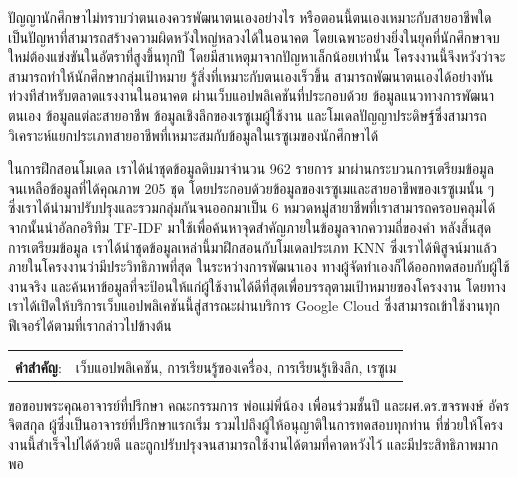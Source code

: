 \documentclass[12pt,oneside,openright,a4paper]{cpe-thai-project}
\begin{document}
\thaiabstract

ปัญญานักศึกษาไม่ทราบว่าตนเองควรพัฒนาตนเองอย่างไร หรือตอนนี้ตนเองเหมาะกับสายอาชีพใด เป็นปัญหาที่สามารถสร้างความผิดหวังใหญ่หลวงได้ในอนาคต
โดยเฉพาะอย่างยิ่งในยุคที่นักศึกษาจบใหม่ต้องแข่งขันในอัตราที่สูงขึ้นทุกปี โดยมีสาเหตุมาจากปัญหาเล็กน้อยเท่านั้น โครงงานนี้จึงหวังว่าจะสามารถทำให้นักศึกษากลุ่มเป้าหมาย
รู้สิ่งที่เหมาะกับตนเองเร็วขึ้น สามารถพัฒนาตนเองได้อย่างทันท่วงทีสำหรับตลาดแรงงานในอนาคต ผ่านเว็บแอปพลิเคชันที่ประกอบด้วย ข้อมูลแนวทางการพัฒนาตนเอง ข้อมูลแต่ละสายอาชีพ ข้อมูลเชิงลึกของเรซูเมผู้ใช้งาน
และโมเดลปัญญาประดิษฐ์ซึ่งสามารถวิเคราะห์แยกประเภทสายอาชีพที่เหมาะสมกับข้อมูลในเรซูเมของนักศึกษาได้

ในการฝึกสอนโมเดล เราได้นำชุดข้อมูลดิบมาจำนวน 962 รายการ มาผ่านกระบวนการเตรียมข้อมูล จนเหลือข้อมูลที่ได้คุณภาพ 205 ชุด โดยประกอบด้วยข้อมูลของเรซูเมและสายอาชีพของเรซูเมนั้น ๆ
ซึ่งเราได้นำมาปรับปรุงและรวมกลุ่มกันจนออกมาเป็น 6 หมวดหมู่สายาชีพที่เราสามารถครอบคลุมได้ จากนั้นนำอัลกอริทึม TF-IDF มาใช้เพื่อค้นหาจุดสำคัญภายในข้อมูลจากความถี่ของคำ
หลังสิ้นสุดการเตรียมข้อมูล เราได้นำชุดข้อมูลเหล่านี้มาฝึกสอนกับโมเดลประเภท KNN ซึ่งเราได้พิสูจน์มาแล้วภายในโครงงานว่ามีประวิทธิภาพที่สุด
ในระหว่างการพัฒนาเอง ทางผู้จัดทำเองก็ได้ออกทดสอบกับผู้ใช้งานจริง และค้นหาข้อมูลที่จะป้อนให้แก่ผู้ใช้งานได้ดีที่สุดเพื่อบรรลุตามเป้าหมายของโครงงาน
โดยทางเราได้เปิดให้บริการเว็บแอปพลิเคชันนี้สู่สารณะผ่านบริการ Google Cloud ซึ่งสามารถเข้าใช้งานทุกฟีเจอร์ได้ตามที่เรากล่าวไปข้างต้น

\begin{flushleft}
    \begin{tabular*}{\textwidth}{@{}lp{}}
        & \\

        \textbf{คำสำคัญ}: & เว็บแอปพลิเคชัน, การเรียนรู้ของเครื่อง, การเรียนรู้เชิงลึก, เรซูเม
    \end{tabular*}
\end{flushleft}
\endabstract


\preface
ขอขอบพระคุณอาจารย์ที่ปรึกษา คณะกรรมการ พ่อแม่พี่น้อง เพื่อนร่วมชั้นปี และผศ.ดร.ขจรพงษ์ อัครจิตสกุล ผู้ซึ่งเป็นอาจารย์ที่ปรึกษาแรกเริ่ม
รวมไปถึงผู้ให้อนุญาติในการทดสอบทุกท่าน
ที่ช่วยให้โครงงานนี้สำเร็จไปได้ด้วยดี และถูกปรับปรุงจนสามารถใช้งานได้ตามที่คาดหวังไว้ และมีประสิทธิภาพมากพอ
\end{document}
